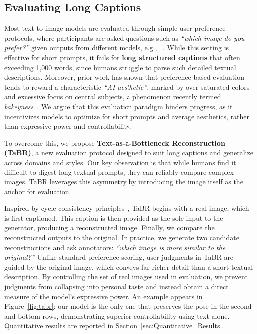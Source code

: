 \subsection{Evaluating Long Captions}
\label{sec:eval}



Most text-to-image models are evaluated through simple user-preference protocols, where participants are asked questions such as \textit{``which image do you prefer?''} given outputs from different models, e.g., ~\cite{esser2024scaling}. While this setting is effective for short prompts, it fails for \textbf{long structured captions} that often exceeding 1{,}000 words, since humans struggle to parse such detailed textual descriptions. Moreover, prior work has shown that preference-based evaluation tends to reward a characteristic \textit{``AI aesthetic''}, marked by over-saturated colors and excessive focus on central subjects, a phenomenon recently termed \textit{bakeyness}~\cite{batifol2025flux}. We argue that this evaluation paradigm hinders progress, as it incentivizes models to optimize for short prompts and average aesthetics, rather than expressive power and controllability.  


To overcome this, we propose \textbf{Text-as-a-Bottleneck Reconstruction (TaBR)}, a new evaluation protocol designed to suit long captions and generalize across domains and styles. Our key observation is that while humans find it difficult to digest long textual prompts, they can reliably compare complex images. TaBR leverages this asymmetry by introducing the image itself as the anchor for evaluation.  


Inspired by cycle-consistency principles~\cite{bahng2025cycle}, TaBR begins with a real image, which is first captioned. This caption is then provided as the sole input to the generator, producing a reconstructed image. Finally, we compare the reconstructed outputs to the original. In practice, we generate two candidate reconstructions and ask annotators: \textit{``which image is more similar to the original?''} Unlike standard preference scoring, user judgments in TaBR are guided by the original image, which conveys far richer detail than a short textual description. By controlling the set of real images used in evaluation, we prevent judgments from collapsing into personal taste and instead obtain a direct measure of the model’s expressive power. An example appears in Figure~\ref{fig:tabr}: our model is the only one that preserves the pose in the second and bottom rows, demonstrating superior controllability using text alone. Quantitative results are reported in Section~\ref{sec:Quantitative_Results}.

